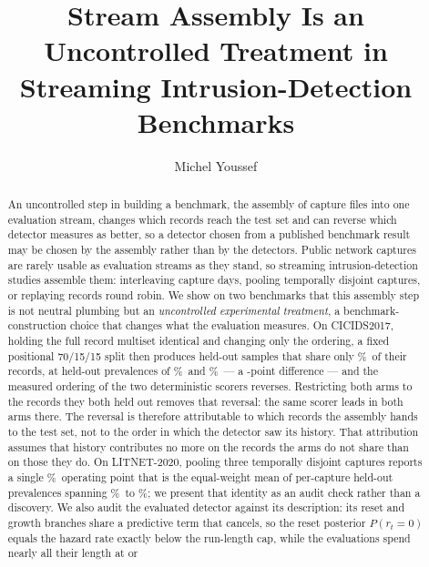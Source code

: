 \documentclass[manuscript,screen,nonacm]{acmart}
\begin{document}
\title{Stream Assembly Is an Uncontrolled Treatment in Streaming
Intrusion-Detection Benchmarks}

\author{Michel Youssef}

\begin{abstract}
An uncontrolled step in building a benchmark, the assembly of capture files into
one evaluation stream, changes which records reach the test set and can reverse
which detector measures as better, so a detector chosen from a published
benchmark result may be chosen by the assembly rather than by the detectors.
Public network captures are rarely usable as evaluation streams as they stand,
so streaming intrusion-detection studies assemble them: interleaving capture
days, pooling temporally disjoint captures, or replaying records round robin.
We show on two benchmarks that this assembly step is not neutral plumbing but
an \emph{uncontrolled experimental treatment}, a benchmark-construction choice
that changes what the evaluation measures. On CICIDS2017, holding the full
record multiset identical and changing only the ordering, a fixed positional
70/15/15 split then produces held-out samples that share only
\CicidsHeldoutOverlapPct\%\ of their records, at held-out prevalences of
\SFourCicidsNaturalTestPrev\%\ and \SFourCicidsInterleavedTestPrev\%\ --- a
\SFourCicidsPrevShiftAbsPp-point difference --- and the measured ordering of
the two deterministic scorers reverses. Restricting both arms to the
\RevSharedRecords{} records they both held out removes that reversal: the same
scorer leads in both arms there. The reversal is therefore attributable to
which records the assembly hands to the test set, not to the order in which
the detector saw its history. That attribution assumes that history contributes
no more on the records the arms do not share than on those they do.
On LITNET-2020, pooling three temporally disjoint captures reports a single
\SFourLitnetPooledTestPrev\%\ operating point that is the equal-weight mean of
per-capture held-out prevalences spanning \SFourLitnetSpamTestPrev\%\ to
\SFourLitnetUdpFloodTestPrev\%; we present that identity as an audit check
rather than a discovery. We also audit the evaluated detector against its
description: its reset and growth branches share a predictive term that
cancels, so the reset posterior $P(r_t{=}0)$ equals the hazard rate exactly
below the run-length cap, while the evaluations spend nearly all their length at or

\end{abstract}
\end{document}
